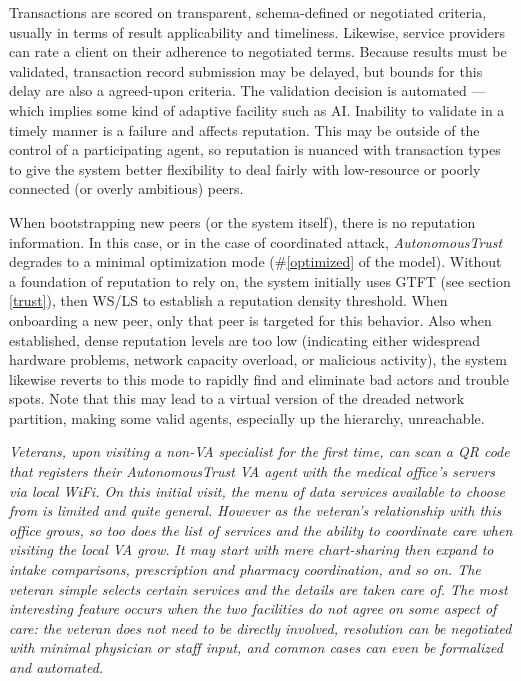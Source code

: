 \documentclass[10pt, twoside]{article}
\newenvironment{ppl}{\fontfamily{ppl}\selectfont\itshape}{\par}
\newcommand{\projectName}{\emph{AutonomousTrust }}
\begin{document}
Transactions are scored on transparent, schema-defined or negotiated criteria, usually in terms of result applicability and timeliness. Likewise, service providers can rate a client on their adherence to negotiated terms. Because results must be validated, transaction record submission may be delayed, but bounds for this delay are also a agreed-upon criteria. The validation decision is automated --- which implies some kind of adaptive facility such as AI. Inability to validate in a timely manner is a failure and affects reputation. This may be outside of the control of a participating agent, so reputation is nuanced with transaction types to give the system better flexibility to deal fairly with low-resource or poorly connected (or overly ambitious) peers.

When bootstrapping new peers (or the system itself), there is no reputation information. In this case, or in the case of coordinated attack, \projectName degrades to a minimal optimization mode (\#\ref{optimized} of the model). Without a foundation of reputation to rely on, the system initially uses GTFT (see section \ref{trust}), then WS/LS to establish a reputation density threshold. When onboarding a new peer, only that peer is targeted for this behavior. Also when established, dense reputation levels are too low (indicating either widespread hardware problems, network capacity overload, or malicious activity), the system likewise reverts to this mode to rapidly find and eliminate bad actors and trouble spots. Note that this may lead to a virtual version of the dreaded network partition, making some valid agents, especially up the hierarchy, unreachable.

\begin{ppl}
Veterans, upon visiting a non-VA specialist for the first time, can scan a QR code that registers their \projectName VA agent with the medical office's servers via local WiFi. On this initial visit, the menu of data services available to choose from is limited and quite general. However as the veteran's relationship with this office grows, so too does the list of services and the ability to coordinate care when visiting the local VA grow. It may start with mere chart-sharing then expand to intake comparisons, prescription and pharmacy coordination, and so on. The veteran simple selects certain services and the details are taken care of. The most interesting feature occurs when the two facilities do not agree on some aspect of care: the veteran does not need to be directly involved, resolution can be negotiated with minimal physician or staff input, and common cases can even be formalized and automated.
\end{ppl}
\end{document}
